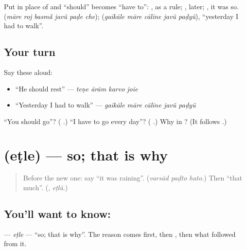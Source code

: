 Put \textbf{} in place of \textbf{} and \textquotedblleft{}should\textquotedblright{} becomes \textquotedblleft{}have to\textquotedblright{}: \textbf{ }, as a rule; \textbf{}, later; \textbf{}, it was so. \textbf{     } (\emph{māre roj basmā̃ javũ paḍe che}); \textbf{    } (\emph{gaīkāle māre cālīne javũ paḍyũ}), \textquotedblleft{}yesterday I had to walk\textquotedblright{}.

\subsection*{Your turn}
Say these aloud:

\begin{itemize}
\raggedright
  \item \textquotedblleft{}He should rest\textquotedblright{} — \emph{teṇe ārām karvo joīe}
  \item \textquotedblleft{}Yesterday I had to walk\textquotedblright{} — \emph{gaīkāle māre cālīne javũ paḍyũ}
\end{itemize}

\begin{tcolorbox}[breakable,colback=teal!4,colframe=teal!35!black,title={Before you move on}]
\textquotedblleft{}You should go\textquotedblright{}? (\textbf{  }.) \textquotedblleft{}I have to go every day\textquotedblright{}? (\textbf{    }.) Why \textbf{} in \textbf{   }? (It follows \textbf{}.)
\end{tcolorbox}
\section[\texorpdfstring{\gu{એટલે} (eṭle)}{એટલે (eṭle)}]{ (eṭle) — so; that is why}

\label{lesson:GU-C278-etle}



\begin{quote}
Before the new one: say \textquotedblleft{}it was raining\textquotedblright{}. (\emph{varsād paḍto hato}.) Then \textquotedblleft{}that much\textquotedblright{}. (\textbf{}, \emph{eṭlũ}.)
\end{quote}

\subsection*{You'll want to know: }
\textbf{} — \emph{eṭle} — \textquotedblleft{}so; that is why\textquotedblright{}. The reason comes first, then \textbf{}, then what followed from it.

